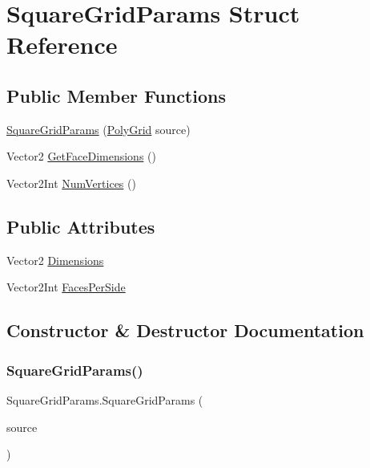 \hypertarget{struct_square_grid_params}{}\section{Square\+Grid\+Params Struct Reference}
\label{struct_square_grid_params}
\subsection*{Public Member Functions}
\begin{DoxyCompactItemize}
\item 
\mbox{\hyperlink{struct_square_grid_params_a0a79f3a8860e1efdf383128bda2171da}{Square\+Grid\+Params}} (\mbox{\hyperlink{class_poly_grid}{Poly\+Grid}} source)
\item 
Vector2 \mbox{\hyperlink{struct_square_grid_params_a251c90bf64a7b0d0ea2b8f572910d912}{Get\+Face\+Dimensions}} ()
\item 
Vector2\+Int \mbox{\hyperlink{struct_square_grid_params_a22366f3bf69926bad2d21e5967112495}{Num\+Vertices}} ()
\end{DoxyCompactItemize}
\subsection*{Public Attributes}
\begin{DoxyCompactItemize}
\item 
Vector2 \mbox{\hyperlink{struct_square_grid_params_ad205c7b2c188015047991266aa64eadc}{Dimensions}}
\item 
Vector2\+Int \mbox{\hyperlink{struct_square_grid_params_af19744bb944c6a51cacd30c9d3ac9059}{Faces\+Per\+Side}}
\end{DoxyCompactItemize}


\subsection{Constructor \& Destructor Documentation}
\mbox{\label{struct_square_grid_params_a0a79f3a8860e1efdf383128bda2171da}} 
\subsubsection{\texorpdfstring{Square\+Grid\+Params()}{SquareGridParams()}}
{\footnotesize\ttfamily Square\+Grid\+Params.\+Square\+Grid\+Params (\begin{DoxyParamCaption}\item[{\mbox{\hyperlink{class_poly_grid}{Poly\+Grid}}}]{source }\end{DoxyParamCaption})}



